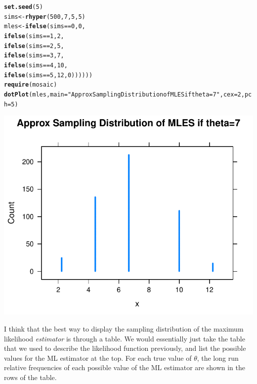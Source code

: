 \documentclass[12pt]{article}\usepackage[]{graphicx}\usepackage[]{color}
\makeatletter
\newcommand{\hlnum}[1]{\textcolor[rgb]{0.686,0.059,0.569}{#1}}%
\newcommand{\hlstr}[1]{\textcolor[rgb]{0.192,0.494,0.8}{#1}}%
\newcommand{\hlopt}[1]{\textcolor[rgb]{0,0,0}{#1}}%
\newcommand{\hlstd}[1]{\textcolor[rgb]{0.345,0.345,0.345}{#1}}%
\newcommand{\hlkwb}[1]{\textcolor[rgb]{0.69,0.353,0.396}{#1}}%
\newcommand{\hlkwc}[1]{\textcolor[rgb]{0.333,0.667,0.333}{#1}}%
\newcommand{\hlkwd}[1]{\textcolor[rgb]{0.737,0.353,0.396}{\textbf{#1}}}%
\newenvironment{kframe}{%
 \def\at@end@of@kframe{}%
 \ifinner\ifhmode%
  \def\at@end@of@kframe{\end{minipage}}%
  \begin{minipage}{\columnwidth}%
 \fi\fi%
 \def\FrameCommand##1{\hskip\@totalleftmargin \hskip-\fboxsep
 \colorbox{shadecolor}{##1}\hskip-\fboxsep
     \hskip-\linewidth \hskip-\@totalleftmargin \hskip\columnwidth}%
 \MakeFramed {\advance\hsize-\width
   \@totalleftmargin\z@ \linewidth\hsize
   \@setminipage}}%
 {\par\unskip\endMakeFramed%
 \at@end@of@kframe}
\newenvironment{knitrout}{}{} %
\makeatother
\begin{document}
\begin{doublespacing}
\begin{enumerate}
\begin{knitrout}\footnotesize
{}\color{fgcolor}\begin{kframe}
\begin{alltt}
\hlkwd{set.seed}\hlstd{(}\hlnum{5}\hlstd{)}
\hlstd{sims} \hlkwb{<-} \hlkwd{rhyper}\hlstd{(}\hlnum{500}\hlstd{,} \hlnum{7}\hlstd{,} \hlnum{5}\hlstd{,} \hlnum{5}\hlstd{)}
\hlstd{mles} \hlkwb{<-} \hlkwd{ifelse}\hlstd{(sims}\hlopt{==}\hlnum{0}\hlstd{,} \hlnum{0}\hlstd{,}
               \hlkwd{ifelse}\hlstd{(sims}\hlopt{==}\hlnum{1}\hlstd{,} \hlnum{2}\hlstd{,}
                      \hlkwd{ifelse}\hlstd{(sims}\hlopt{==}\hlnum{2}\hlstd{,} \hlnum{5}\hlstd{,}
                             \hlkwd{ifelse}\hlstd{(sims}\hlopt{==}\hlnum{3}\hlstd{,} \hlnum{7}\hlstd{,}
                                    \hlkwd{ifelse}\hlstd{(sims}\hlopt{==}\hlnum{4}\hlstd{,} \hlnum{10}\hlstd{,}
                                           \hlkwd{ifelse}\hlstd{(sims}\hlopt{==}\hlnum{5}\hlstd{,} \hlnum{12}\hlstd{,} \hlnum{0}\hlstd{))))))}
\hlkwd{require}\hlstd{(mosaic)}
\hlkwd{dotPlot}\hlstd{(mles,} \hlkwc{main}\hlstd{=}\hlstr{"Approx Sampling Distribution of MLES if theta=7"}\hlstd{,} \hlkwc{cex}\hlstd{=}\hlnum{2}\hlstd{,} \hlkwc{pch}\hlstd{=}\hlnum{5}\hlstd{)}
\end{alltt}
\end{kframe}
\includegraphics[width=.5\linewidth]{figure/sim-1} 

\end{knitrout}

I think that the best way to display the sampling distribution of the maximum likelihood {\it estimator} is through a table. We would essentially just take the table that we used to describe the likelihood function previously, and list the possible values for the ML estimator at the top. For each true value of $\theta$, the long run relative frequencies of each possible value of the ML estimator are shown in the rows of the table.


\end{enumerate}
\end{doublespacing}
\end{document}
